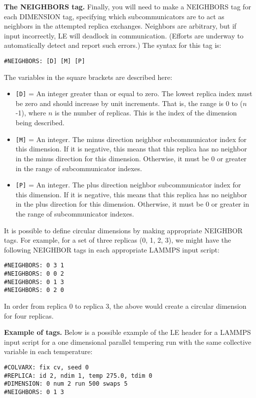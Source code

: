 \documentclass[10pt]{article}
\begin{document}
\textbf{The NEIGHBORS tag.}
Finally, you will need to make a NEIGHBORS tag for each DIMENSION tag, specifying which
subcommunicators are to act as neighbors in the attempted replica exchanges. Neighbors
are arbitrary, but if input incorrectly, LE will deadlock in communication. (Efforts
are underway to automatically detect and report such errors.) The syntax for this
tag is:
\begin{verbatim}
#NEIGHBORS: [D] [M] [P]
\end{verbatim}
The variables in the square brackets are described here:
\begin{itemize}
\item	\texttt{[D]} = An integer greater than or equal to zero. The lowest
		replica index must be zero and should increase by unit increments. That is,
		the range is 0 to ($n$-1), where $n$ is the number of replicas. This is
		the index of the dimension being described.
\item   \texttt{[M]} = An integer. The minus direction neighbor subcommunicator
		index for this dimension. If it is negative, this means that this 
		replica has no neighbor in the minus direction for this dimension. Otherwise,
		it must be 0 or greater in the range of subcommunicator indexes.
\item   \texttt{[P]} = An integer. The plus direction neighbor subcommunicator
		index for this dimension. If it is negative, this means that this 
		replica has no neighbor in the plus direction for this dimension. Otherwise,
		it must be 0 or greater in the range of subcommunicator indexes.
\end{itemize}

It is possible to define circular dimensions by making appropriate NEIGHBOR tags. For
example, for a set of three replicas (0, 1, 2, 3), we might have the following NEIGHBOR tags
in each appropriate LAMMPS input script:
\begin{verbatim}
#NEIGHBORS: 0 3 1
#NEIGHBORS: 0 0 2
#NEIGHBORS: 0 1 3
#NEIGHBORS: 0 2 0
\end{verbatim}
In order from replica 0 to replica 3, the above would create a circular dimension for four
replicas.


\textbf{Example of tags.}
Below is a possible example of the LE header for a LAMMPS input script for a one dimensional
parallel tempering run with the same collective variable in each temperature:
\begin{verbatim}
#COLVARX: fix cv, seed 0
#REPLICA: id 2, ndim 1, temp 275.0, tdim 0
#DIMENSION: 0 num 2 run 500 swaps 5
#NEIGHBORS: 0 1 3
\end{verbatim}
\end{document}
